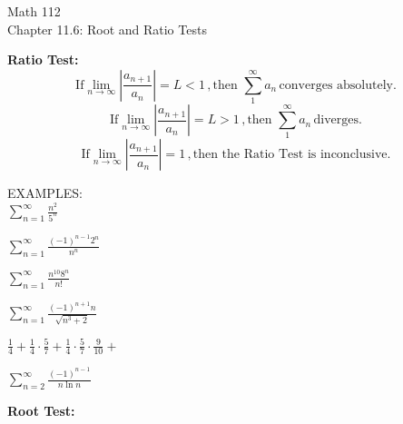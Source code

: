 \documentclass[11pt]{article}
\begin{document}
\begin{center}
\Large
\rm{Math 112}
\\
\rm{Chapter 11.6:  Root and Ratio Tests}
\\
\end{center}
\vspace{0.2in}

{\bf Ratio Test:}  \\

  \begin{displaymath}
\mbox{If} \lim_{n\to \infty}\left|\frac{a_{n+1}}{a_n}\right| = L < 1 \,, \mbox{then } \sum_1^{\infty}a_n \, \mbox{converges absolutely.}
  \end{displaymath}
    \begin{displaymath}
\mbox{If} \lim_{n\to \infty}\left|\frac{a_{n+1}}{a_n}\right| = L > 1 \,, \mbox{then } \sum_1^{\infty}a_n \, \mbox{diverges.}
      \end{displaymath}
  \begin{displaymath}
\mbox{If} \lim_{n\to \infty}\left|\frac{a_{n+1}}{a_n}\right| = 1 \,, \mbox{then the Ratio Test is inconclusive.}
      \end{displaymath}

  \vspace{0.2in}

 EXAMPLES:\\

 $\sum_{n=1}^{\infty} \frac{n^2}{5^n}$

 \vspace{1.5in}
 
 $\sum_{n=1}^{\infty} \frac{(-1)^{n-1}2^n}{n^n}$


 \vspace{1.5in}
 
 $\sum_{n=1}^{\infty} \frac{n^{10}8^n}{n!}$

 \pagebreak

  $\sum_{n=1}^{\infty} \frac{(-1)^{n+1}n}{\sqrt{n^3+2}}$


 \vspace{3in}

$\frac14 + \frac14\cdot\frac57 +  \frac14\cdot\frac57\cdot\frac{9}{10} + $


\vspace{2.5in}


$\sum_{n=2}^{\infty} \frac{(-1)^{n-1}}{n\ln{n}}$

\pagebreak

{\bf Root Test:}  \\
\end{document}
